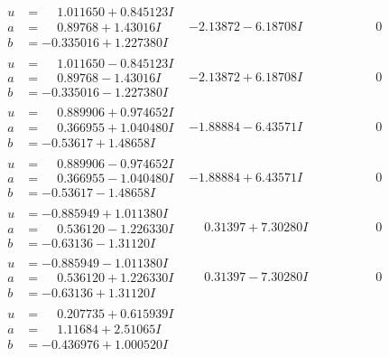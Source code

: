 \documentclass[1p]{elsarticle_modified}
\theoremstyle{definition}
\begin{document}
$$\begin{array}{c|c|c}
\begin{aligned}
u &= \phantom{-}1.011650 + 0.845123 I \\
a &= \phantom{-}0.89768 + 1.43016 I \\
b &= -0.335016 + 1.227380 I\end{aligned}
 & -2.13872 - 6.18708 I & \phantom{-0.000000 } 0 \\ \hline\begin{aligned}
u &= \phantom{-}1.011650 - 0.845123 I \\
a &= \phantom{-}0.89768 - 1.43016 I \\
b &= -0.335016 - 1.227380 I\end{aligned}
 & -2.13872 + 6.18708 I & \phantom{-0.000000 } 0 \\ \hline\begin{aligned}
u &= \phantom{-}0.889906 + 0.974652 I \\
a &= \phantom{-}0.366955 + 1.040480 I \\
b &= -0.53617 + 1.48658 I\end{aligned}
 & -1.88884 - 6.43571 I & \phantom{-0.000000 } 0 \\ \hline\begin{aligned}
u &= \phantom{-}0.889906 - 0.974652 I \\
a &= \phantom{-}0.366955 - 1.040480 I \\
b &= -0.53617 - 1.48658 I\end{aligned}
 & -1.88884 + 6.43571 I & \phantom{-0.000000 } 0 \\ \hline\begin{aligned}
u &= -0.885949 + 1.011380 I \\
a &= \phantom{-}0.536120 - 1.226330 I \\
b &= -0.63136 - 1.31120 I\end{aligned}
 & \phantom{-}0.31397 + 7.30280 I & \phantom{-0.000000 } 0 \\ \hline\begin{aligned}
u &= -0.885949 - 1.011380 I \\
a &= \phantom{-}0.536120 + 1.226330 I \\
b &= -0.63136 + 1.31120 I\end{aligned}
 & \phantom{-}0.31397 - 7.30280 I & \phantom{-0.000000 } 0 \\ \hline\begin{aligned}
u &= \phantom{-}0.207735 + 0.615939 I \\
a &= \phantom{-}1.11684 + 2.51065 I \\
b &= -0.436976 + 1.000520 I\end{aligned}

\end{array}$$
\end{document}
